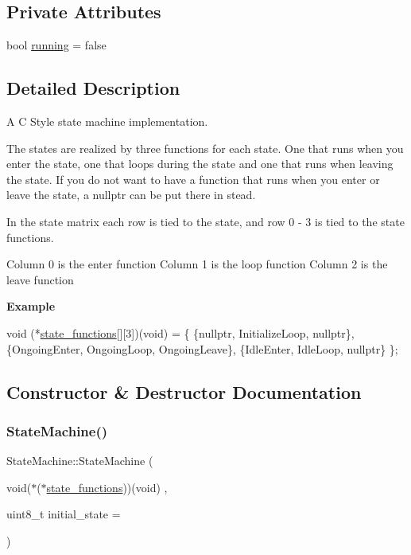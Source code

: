 \subsection*{Private Attributes}
\begin{DoxyCompactItemize}
\item 
bool \hyperlink{class_state_machine_adc6939485a12a6250df3cc65aa172d2a}{running} = false
\end{DoxyCompactItemize}


\subsection{Detailed Description}
A C Style state machine implementation. 

The states are realized by three functions for each state. One that runs when you enter the state, one that loops during the state and one that runs when leaving the state. If you do not want to have a function that runs when you enter or leave the state, a nullptr can be put there in stead.

In the state matrix each row is tied to the state, and row 0 -\/ 3 is tied to the state functions.

Column 0 is the enter function   Column 1 is the loop function   Column 2 is the leave function 

{\bfseries Example} 
\begin{DoxyCode}
 void (*\hyperlink{class_state_machine_acc87359cd98c436f5b891ffe6cb67160}{state\_functions}[][3])(void) = \{
\{\textcolor{keyword}{nullptr}, InitializeLoop, \textcolor{keyword}{nullptr}\},
\{OngoingEnter, OngoingLoop, OngoingLeave\},
\{IdleEnter, IdleLoop,       \textcolor{keyword}{nullptr}\}
\};
\end{DoxyCode}
 

\subsection{Constructor \& Destructor Documentation}
\hypertarget{class_state_machine_ad9c6bdaca444710f77fc12d7e1af8fdc}{}\label{class_state_machine_ad9c6bdaca444710f77fc12d7e1af8fdc} 
\subsubsection{\texorpdfstring{State\+Machine()}{StateMachine()}}
{\footnotesize\ttfamily State\+Machine\+::\+State\+Machine (\begin{DoxyParamCaption}\item[{void($\ast$($\ast$\hyperlink{class_state_machine_acc87359cd98c436f5b891ffe6cb67160}{state\+\_\+functions}))(void)}]{,  }\item[{uint8\+\_\+t}]{initial\+\_\+state = {} }\end{DoxyParamCaption})\hspace{0.3cm}{\ttfamily [inline]}}

